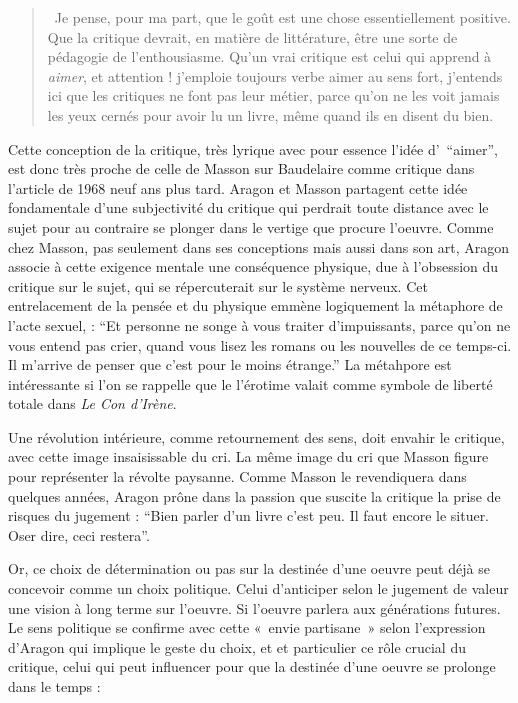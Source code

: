      \begin{quote}
       Je pense, pour ma part, que le goût est une chose essentiellement positive. Que la critique devrait, en matière de littérature, être une sorte de pédagogie de l’enthousiasme. Qu’un vrai critique est celui qui apprend à \emph{aimer}, et attention ! j’emploie toujours verbe aimer au sens fort, j’entends ici que les critiques ne font pas leur métier, parce qu’on ne les voit jamais les yeux cernés pour avoir lu un livre, même quand ils en disent du bien.    
     \end{quote}


	 Cette conception de la critique, très lyrique avec pour essence l’idée d’ \enquote{aimer},  est donc très proche de celle de Masson sur Baudelaire comme critique dans l’article de 1968 neuf ans plus tard. Aragon et Masson partagent cette idée fondamentale d’une subjectivité du critique qui perdrait toute distance avec le sujet pour au contraire se plonger dans le vertige que procure l’oeuvre. Comme chez Masson, pas seulement dans ses conceptions mais aussi dans son art, Aragon associe à cette exigence mentale une conséquence physique, due à l’obsession du critique sur le sujet, qui se répercuterait sur le système nerveux. Cet entrelacement de la pensée et du physique emmène logiquement la métaphore de l’acte sexuel, : \enquote{Et personne ne songe à vous traiter d’impuissants, parce qu’on ne vous entend pas crier, quand vous lisez les romans ou les nouvelles de ce temps-ci. Il m’arrive de penser que c’est pour le moins étrange.} La métahpore est intéressante si l'on se rappelle que le l'érotime valait comme symbole de liberté totale dans \emph{Le Con d'Irène}. 

     	Une révolution intérieure, comme retournement des sens, doit envahir le critique, avec cette image insaisissable du cri. La même image du cri que Masson figure pour représenter la révolte paysanne. Comme Masson le revendiquera dans quelques années, Aragon prône dans la passion que suscite la critique la prise de risques du jugement : \enquote{Bien parler d’un livre c’est peu. Il faut encore le situer. Oser dire, ceci restera}. 

 Or, ce choix de détermination ou pas sur la destinée d’une oeuvre peut déjà se concevoir comme un choix politique. Celui d’anticiper selon le jugement de valeur une vision à long terme sur l’oeuvre. Si l’oeuvre parlera aux générations futures. Le sens politique se confirme avec cette « envie partisane » selon l’expression d’Aragon qui implique le geste du choix, et et particulier ce rôle crucial du critique, celui qui peut influencer pour que la destinée d’une oeuvre se prolonge dans le temps : 

